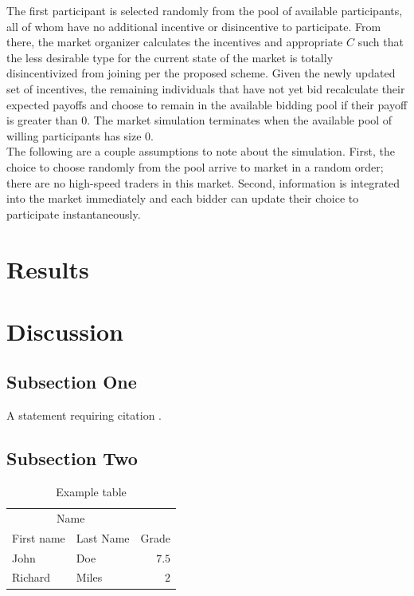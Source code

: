 \documentclass[twoside,twocolumn]{article}
\begin{document}
The first participant is selected randomly from the pool of available participants, all of whom have no additional incentive or disincentive to participate. From there, the market organizer calculates the incentives and appropriate $C$ such that the less desirable type for the current state of the market is totally disincentivized from joining per the proposed scheme. Given the newly updated set of incentives, the remaining individuals that have not yet bid recalculate their expected payoffs and choose to remain in the available bidding pool if their payoff is greater than 0. The market simulation terminates when the available pool of willing participants has size 0.\\

The following are a couple assumptions to note about the simulation. First, the choice to choose randomly from the pool arrive to market in a random order; there are no high-speed traders in this market. Second, information is integrated into the market immediately and each bidder can update their choice to participate instantaneously.












\section{Results}



\section{Discussion}

\subsection{Subsection One}

A statement requiring citation \cite{Figueredo:2009dg}.
\blindtext %

\subsection{Subsection Two}

\blindtext %

\begin{table}
\caption{Example table}
\centering
\begin{tabular}{llr}
\toprule
\multicolumn{2}{c}{Name} \\
\cmidrule(r){1-2}
First name & Last Name & Grade \\
\midrule
John & Doe & $7.5$ \\
Richard & Miles & $2$ \\
\bottomrule
\end{tabular}
\end{table}
\end{document}
